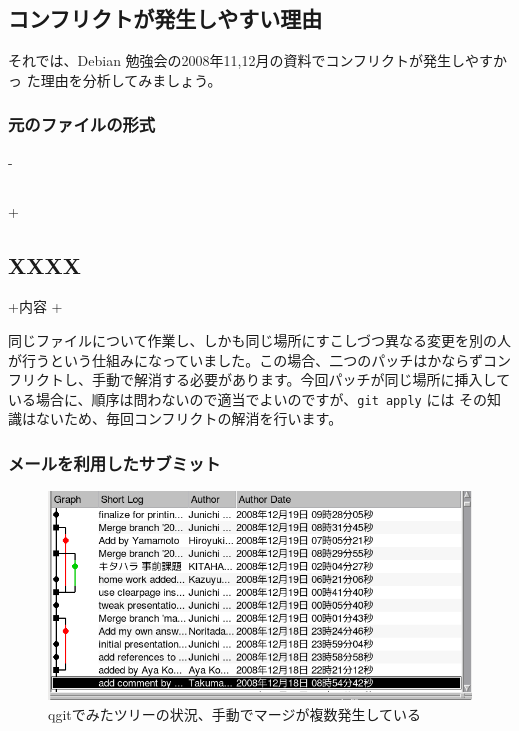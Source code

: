 \documentclass[mingoth,a4paper]{jsarticle}
\begin{document}
\subsection{コンフリクトが発生しやすい理由}

それでは、Debian 勉強会の2008年11,12月の資料でコンフリクトが発生しやすかっ
た理由を分析してみましょう。

\subsubsection{元のファイルの形式}

\begin{commandline}
-\subsection{}
+\subsection{XXXX}
+内容
+
\end{commandline}

同じファイルについて作業し、しかも同じ場所にすこしづつ異なる変更を別の人
が行うという仕組みになっていました。この場合、二つのパッチはかならずコン
フリクトし、手動で解消する必要があります。今回パッチが同じ場所に挿入して
いる場合に、順序は問わないので適当でよいのですが、\texttt{git apply} には
その知識はないため、毎回コンフリクトの解消を行います。

\subsubsection{メールを利用したサブミット}

\begin{figure}
 \includegraphics[width=\hsize]{image200901/qgit-trees.png}
 \caption{qgitでみたツリーの状況、手動でマージが複数発生している}
 \label{fig:mergedtokyodebian}
\end{figure}
\end{document}
